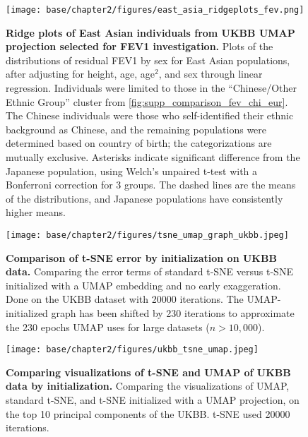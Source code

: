 \newpage

\begin{figure}[ht]
    \centering
    \texttt{[image: base/chapter2/figures/east\_asia\_ridgeplots\_fev.png]}
    \caption[Ridge plots of East Asian individuals from UKBB UMAP projection selected for FEV1 investigation]{\textbf{Ridge plots of East Asian individuals from UKBB UMAP projection selected for FEV1 investigation.} Plots of the distributions of residual FEV1 by sex for East Asian populations, after adjusting for height, age, age$^2$, and sex through linear regression. Individuals were limited to those in the ``Chinese/Other Ethnic Group'' cluster from \ref{fig:supp_comparison_fev_chi_eur}. The Chinese individuals were those who self-identified their ethnic background as Chinese, and the remaining populations were determined based on country of birth; the categorizations are mutually exclusive. Asterisks indicate significant difference from the Japanese population, using Welch's unpaired t-test with a Bonferroni correction for 3 groups. The dashed lines are the means of the distributions, and Japanese populations have consistently higher means.}
    \label{fig:supp_fev_ridgeplots}
\end{figure}

\newpage

\begin{figure}[!htb]
    \centering
    \texttt{[image: base/chapter2/figures/tsne\_umap\_graph\_ukbb.jpeg]}
    \caption[Comparison of t-SNE error by initialization on UKBB data]{\textbf{Comparison of t-SNE error by initialization on UKBB data.} Comparing the error terms of standard t-SNE versus t-SNE initialized with a UMAP embedding and no early exaggeration. Done on the UKBB dataset with 20000 iterations. The UMAP-initialized graph has been shifted by 230 iterations to approximate the 230 epochs UMAP uses for large datasets ($n>10,000$).}
    \label{fig:supp_tsne_umap_compare_ukbb_graph}
\end{figure}

\newpage

\begin{figure}[!htb]
    \centering
    \texttt{[image: base/chapter2/figures/ukbb\_tsne\_umap.jpeg]}
    \caption[Comparing visualizations of t-SNE and UMAP of UKBB data by initialization]{\textbf{Comparing visualizations of t-SNE and UMAP of UKBB data by initialization.} Comparing the visualizations of UMAP, standard t-SNE, and t-SNE initialized with a UMAP projection, on the top 10 principal components of the UKBB. t-SNE used 20000 iterations.}
    \label{fig:supp_tsne_umap_compare_ukbb}
\end{figure}

